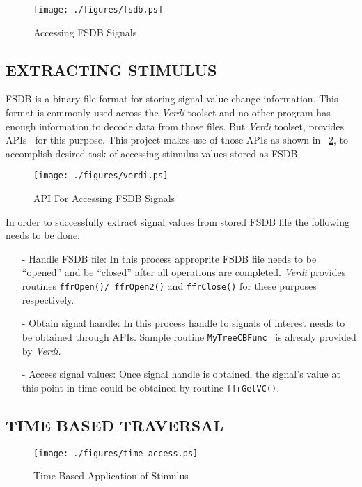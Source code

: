 \begin{figure}[h]
\centering
\texttt{[image: ./figures/fsdb.ps]}
\caption{Accessing FSDB Signals}
\label{fig:fsdb.ps}
\end{figure}

\subsection{EXTRACTING STIMULUS}
FSDB is a binary file format for storing signal value change information. This format is  commonly used across the {\it Verdi} toolset and no other program has enough information to decode data from those files. But {\it Verdi} toolset, provides APIs~\citep{Verdi:FsdbReader}  for this purpose. This project makes use of those APIs as shown in \figurename~{\ref{fig:verdi.eps}}, to accomplish desired task of accessing stimulus values stored as FSDB.

\begin{figure}[h]
\centering
\texttt{[image: ./figures/verdi.ps]}
\caption{API For Accessing FSDB Signals}
\label{fig:verdi.eps}
\end{figure}

In order to successfully extract signal values from stored FSDB file the following needs to be done:
\begin{enumerate}
	\item[-]Handle FSDB file: In this process approprite FSDB file needs to be ``opened'' and be ``closed'' after all operations are completed. {\it Verdi} provides routines \texttt{ffrOpen()/ ffrOpen2()} and \texttt{ffrClose()} for these purposes respectively.
	\item[-]Obtain signal handle: In this process handle to signals of interest needs to be obtained through APIs. Sample routine \texttt{MyTreeCBFunc}~\citep{Verdi:FsdbReader} is already provided by {\it Verdi}.
	\item[-]Access signal values: Once signal handle is obtained, the signal's value at this point in time could be obtained by routine \texttt{ffrGetVC()}.
\end{enumerate}

\subsection{TIME BASED TRAVERSAL}
\begin{figure}[h]
\centering
\texttt{[image: ./figures/time\_access.ps]}
\caption{Time Based Application of Stimulus}
\label{fig:dualsim:tbas}
\end{figure}

